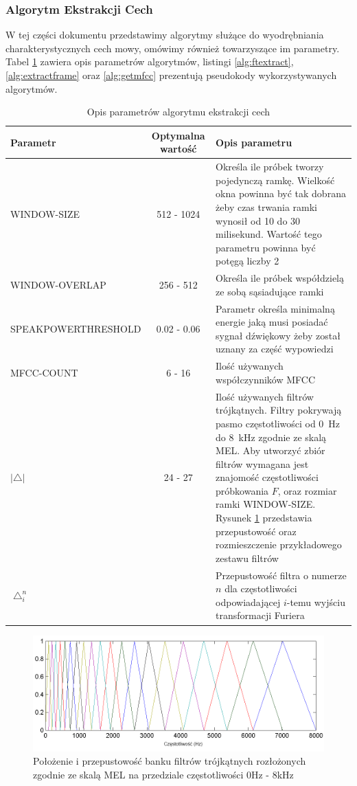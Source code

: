 \documentclass[a4paper]{article}
\begin{document}
		\subsubsection*{Algorytm Ekstrakcji Cech}
		W tej części dokumentu przedstawimy algorytmy służące do 
		wyodrębniania charakterystycznych cech mowy, omówimy również
		towarzyszące im parametry. Tabel \ref{tab:ftextractparams} zawiera
		opis parametrów algorytmów, listingi \ref{alg:ftextract}, \ref{alg:extractframe}
		oraz \ref{alg:getmfcc} prezentują pseudokody wykorzystywanych algorytmów.
		\begin{table}[h]
			\centering
			\begin{tabular}{|p{2.5cm}|c|p{6cm}|}
				\hline
				Parametr & Optymalna wartość & Opis parametru \\
				\hline \hline
				WINDOW-SIZE & 512 - 1024 & Określa ile próbek tworzy pojedynczą
				ramkę. Wielkość okna powinna być tak dobrana żeby czas trwania ramki
				wynosił od 10 do 30 milisekund. Wartość tego parametru powinna być potęgą liczby 2\\
				\hline
				WINDOW-OVERLAP & 256 - 512 & Określa ile próbek współdzielą ze sobą sąsiadujące ramki\\
				\hline
				SPEAK\-POWER\-THRESHOLD & 0.02 - 0.06 & Parametr określa minimalną energie jaką musi
				posiadać sygnał dźwiękowy żeby został uznany za część wypowiedzi \\
				\hline
				MFCC-COUNT & 6 - 16 & Ilość używanych współczynników MFCC \\				
				\hline
				$|\bigtriangleup|$ & 24 - 27 & Ilość używanych filtrów trójkątnych. Filtry pokrywają
				pasmo częstotliwości od 0~Hz do 8~kHz zgodnie ze skalą MEL. Aby utworzyć zbiór filtrów
				wymagana jest znajomość częstotliwości próbkowania $F$, oraz rozmiar ramki WINDOW-SIZE. 
				Rysunek \ref{fig:trifilter} przedstawia przepustowość oraz rozmieszczenie
				przykładowego zestawu filtrów \\
				\hline				
				$\bigtriangleup_i^n$ & & Przepustowość filtra o numerze $n$ dla częstotliwości odpowiadającej
				$i$-temu wyjściu transformacji Furiera \\
				\hline
			\end{tabular}			
			\caption{Opis parametrów algorytmu ekstrakcji cech}
			\label{tab:ftextractparams}
		\end{table}
		\begin{figure}[h]
			\includegraphics[width=\textwidth,trim= 0cm 0cm 0cm 0cm, clip]{./img/triFilter}
			\caption{Położenie i przepustowość banku filtrów trójkątnych rozłożonych zgodnie 
			ze skalą MEL na przedziale częstotliwości 0Hz - 8kHz}
			\label{fig:trifilter}
		\end{figure}
		
\end{document}
